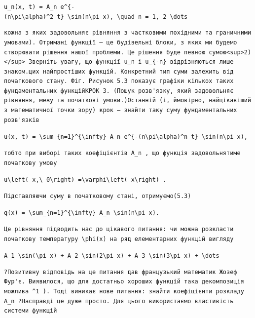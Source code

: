 \documentclass[
  ukrainian,
]{article}
\begin{document}
\texttt{u\_n(x,\ t)\ =\ A\_n\ e\^{}\{-(n\textbackslash{}pi\textbackslash{}alpha)\^{}2\ t\}\ \textbackslash{}sin(n\textbackslash{}pi\ x),\ \textbackslash{}quad\ n\ =\ 1,\ 2\ \textbackslash{}dots}

\begin{verbatim}
кожна з яких задовольняє рівняння з частковими похідними та граничними умовами). Отримані функції — це будівельні блоки, з яких ми будемо створювати рішення нашої проблеми. Це рішення буде певною сумою<sup>2)</sup> Зверніть увагу, що функції u_n і u_{-n} відрізняються лише знаком.цих найпростіших функцій. Конкретний тип суми залежить від початкового стану. Фіг. Рисунок 5.3 показує графіки кількох таких фундаментальних функційКРОК 3. (Пошук розв'язку, який задовольняє рівняння, межу та початкові умови.)Останній (і, ймовірно, найцікавіший з математичної точки зору) крок — знайти таку суму фундаментальних розв'язків
\end{verbatim}

\texttt{u(x,\ t)\ =\ \textbackslash{}sum\_\{n=1\}\^{}\{\textbackslash{}infty\}\ A\_n\ e\^{}\{-(n\textbackslash{}pi\textbackslash{}alpha)\^{}n\ t\}\ \textbackslash{}sin(n\textbackslash{}pi\ x),}

\begin{verbatim}
тобто при виборі таких коефіцієнтів A_n , що функція задовольнятиме початкову умову
\end{verbatim}

\texttt{u\textbackslash{}left(\ x,\textbackslash{}\ 0\textbackslash{}right)\ =\textbackslash{}varphi\textbackslash{}left(\ x\textbackslash{}right)\ .}

\begin{verbatim}
Підставляючи суму в початковому стані, отримуємо(5.3)
\end{verbatim}

\texttt{q(x)\ =\ \textbackslash{}sum\_\{n=1\}\^{}\{\textbackslash{}infty\}\ A\_n\ \textbackslash{}sin(n\textbackslash{}pi\ x).}

\begin{verbatim}
Це рівняння підводить нас до цікавого питання: чи можна розкласти початкову температуру \phi(x) на ряд елементарних функцій вигляду
\end{verbatim}

\texttt{A\_1\ \textbackslash{}sin(\textbackslash{}pi\ x)\ +\ A\_2\ \textbackslash{}sin(2\textbackslash{}pi\ x)\ +\ A\_3\ \textbackslash{}sin(3\textbackslash{}pi\ x)\ +\ \textbackslash{}dots}

\begin{verbatim}
?Позитивну відповідь на це питання дав французький математик Жозеф Фур'є. Виявилося, що для достатньо хороших функцій така декомпозиція можлива ^1 ). Тоді виникає нове питання: знайти коефіцієнти розкладу A_n ?Насправді це дуже просто. Для цього використаємо властивість системи функцій
\end{verbatim}
\end{document}
